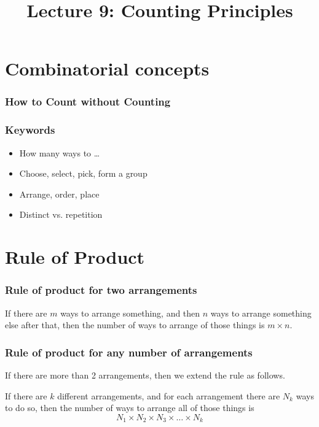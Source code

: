 \title{Lecture 9: Counting Principles}

\frame{\titlepage}

\begin{frame}
\end{frame}

\section[Concept]{Combinatorial concepts}
\frame{\sectionpage}

\begin{frame}
\frametitle{How to Count without Counting}
\end{frame}

\begin{frame}
\frametitle{Keywords}
\begin{itemize}
\item How many ways to \ldots
\item Choose, select, pick, form a group
\item Arrange, order, place
\item Distinct vs. repetition
\end{itemize}
\end{frame}

\section{Rule of Product}
\frame{\sectionpage}

\begin{frame}
\frametitle{Rule of product for two arrangements}
\begin{thm}{}{}
If there are $m$ ways to arrange something, and then $n$ ways to arrange something else after that, then the number of ways to arrange  of those things is $m \times n$.
\end{thm}
\end{frame}

\begin{frame}
\frametitle{Rule of product for any number of arrangements}
If there are more than 2 arrangements, then we extend the rule as follows.
\begin{thm}{}{}
If there are $k$ different arrangements, and for each arrangement there are $N_k$ ways to do so, then the number of ways to arrange all of those things is
\begin{equation} \label{eq:rule_of_product}
 N_1 \times N_2 \times N_3 \times \ldots \times N_k
 \end{equation}
\end{thm}
\end{frame}

